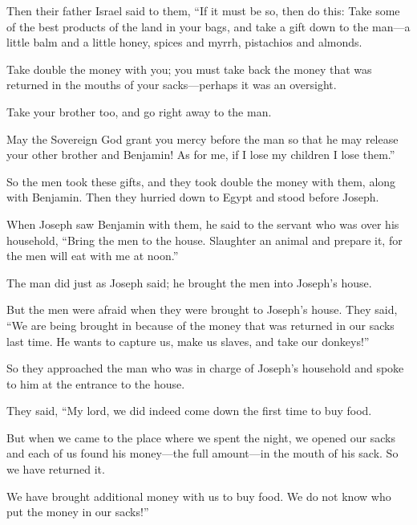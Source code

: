 \begin{scripture}
 Then their father Israel said to them, ``If it must be so, then do this: Take some of the best products of the land in your bags, and take a gift down to the man---a little balm and a little honey, spices and myrrh, pistachios and almonds.
 Take double the money with you; you must take back the money that was returned in the mouths of your sacks---perhaps it was an oversight.
 Take your brother too, and go right away to the man.
 May the Sovereign God grant you mercy before the man so that he may release your other brother and Benjamin! As for me, if I lose my children I lose them.''
\everypar{}

 So the men took these gifts, and they took double the money with them, along with Benjamin. Then they hurried down to Egypt and stood before Joseph.
 When Joseph saw Benjamin with them, he said to the servant who was over his household, ``Bring the men to the house. Slaughter an animal and prepare it, for the men will eat with me at noon.''
 The man did just as Joseph said; he brought the men into Joseph's house.
\everypar{}

 But the men were afraid when they were brought to Joseph's house. They said, ``We are being brought in because of the money that was returned in our sacks last time. He wants to capture us, make us slaves, and take our donkeys!''
 So they approached the man who was in charge of Joseph's household and spoke to him at the entrance to the house.
 They said, ``My lord, we did indeed come down the first time to buy food.
 But when we came to the place where we spent the night, we opened our sacks and each of us found his money---the full amount---in the mouth of his sack. So we have returned it.
 We have brought additional money with us to buy food. We do not know who put the money in our sacks!''
\everypar{}


\end{scripture}
